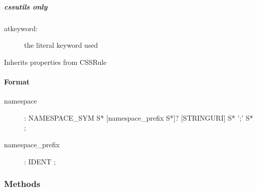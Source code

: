 
\hypertarget{cssutils-only}{}
\subparagraph*{cssutils only}
\label{cssutils-only}
\begin{description}
\item[{atkeyword:}] \leavevmode 
the literal keyword used

\end{description}

Inherits properties from CSSRule



\hypertarget{format}{}
\paragraph*{Format}
\label{format}
\begin{description}
\item[{namespace}] \leavevmode 
: NAMESPACE{\_}SYM S* {[}namespace{\_}prefix S*{]}? {[}STRING{\textbar}URI{]} S* ';' S*
;

\item[{namespace{\_}prefix}] \leavevmode 
: IDENT
;

\end{description}


  \subsubsection{Methods}

    \vspace{0.5ex}

